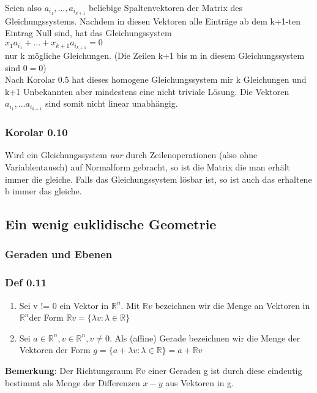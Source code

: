 \documentclass{scrartcl}
\newcommand{\lb}{\lambda}
\newcommand{\R}{\mathbb{R}}
\newcommand{\Rn}{\mathbb{R}^n}
\newcommand{\mRn}{\(\mathbb{R}^n\)}
\begin{document}
Seien also \(a_{i_1}, \dots, a_{i_{k+1}}\) beliebige Spaltenvektoren der Matrix des Gleichungssystems. Nachdem in diesen Vektoren alle Eintr\"age ab dem k+1-ten Eintrag Null sind, hat das Gleichungssystem \\
\(
x_1a_{i_1} + \dots + x_{k+1}a_{i_{k+1}} = 0
\)\\
nur k m\"ogliche Gleichungen. (Die Zeilen k+1 bis m in diesem Gleichungssystem sind \(0=0\))\\
Nach Korolar 0.5 hat dieses homogene Gleichungssystem mir k Gleichungen und k+1 Unbekannten aber mindestens eine nicht triviale L\"osung. Die Vektoren \(a_{i_1}, \dots a_{i_{k+1}}\) sind somit nicht linear unabh\"angig.

\subsubsection{Korolar 0.10}
Wird ein Gleichungssystem \textit{nur} durch Zeilenoperationen (also ohne Variablentausch) auf Normalform gebracht, so ist die Matrix die man erh\"alt immer die gleiche. Falls das Gleichungssystem l\"osbar ist, so ist auch das erhaltene b immer das gleiche.

\subsection{Ein wenig euklidische Geometrie}

\subsubsection{Geraden und Ebenen}
\subsubsection{Def 0.11}
\begin{enumerate}
\item{
Sei v != 0 ein Vektor in \mRn. Mit \(\R v\) bezeichnen wir die Menge an Vektoren in \mRn der Form \(\R v = \{\lb v : \lb \in \R\}\)}
\item{
Sei \(a \in \Rn, v \in \Rn, v \neq 0\). Als (affine) Gerade bezeichnen wir die Menge der Vektoren der Form \(g = \{a + \lb v : \lb \in \R\} = a + \R v\)
}
\end{enumerate}
\textbf{Bemerkung}: Der Richtungsraum \(\R v\) einer Geraden g ist durch diese eindeutig bestimmt als Menge der Differenzen \(x - y\) aus Vektoren in g.\\
\end{document}
